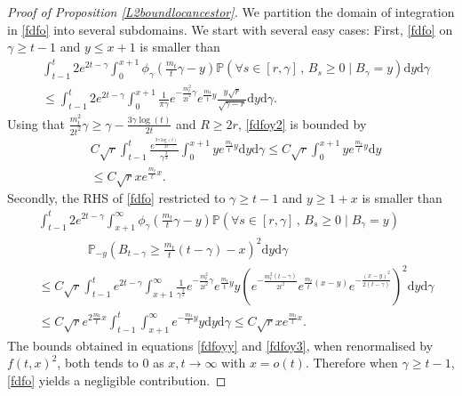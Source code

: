 \documentclass{article}
\newcommand{\Prob}{\mathbb{P}}
\begin{document}
\begin{proof}[Proof of Proposition \ref{L2boundlocancestor}]
We partition the domain of integration in \eqref{fdfo} into several subdomains.
We start with several easy cases: First, \eqref{fdfo} on $\gamma \geq t-1$ and $y \leq x+1$ is smaller than
\begin{equation}\label{fdfoy2}
    \begin{split}
        &\int_{t-1}^t 2e^{2t-\gamma}\int_{0}^{x+1}\phi_\gamma\left(\frac{m_t}{t}\gamma-y\right)\Prob\left(\forall s \in [r, \gamma] \, , \, B_s \geq 0 \mid B_\gamma = y \right)\mathrm{d}y\mathrm{d}\gamma
        \\& \leq \int_{t-1}^t 2e^{2t-\gamma}\int_{0}^{x+1}\frac{1}{\pi \gamma}e^{-\frac{m_t^2}{2t^2}\gamma}e^{\frac{m_t}{t}y}\frac{y \sqrt{r}}{\sqrt{\gamma - r}}\mathrm{d}y\mathrm{d}\gamma.
    \end{split}
\end{equation}
Using that $\frac{m_t^2}{2t^2}\gamma\geq  \gamma -\frac{3\gamma \log(t)}{2t}$ and $R\geq 2r$, \eqref{fdfoy2} is bounded by
\begin{equation}\label{fdfoyy}
    \begin{split}
        &C\sqrt{r}\int_{t-1}^t \frac{e^{\frac{3\gamma \log(t)}{2t}}}{\gamma^{\frac{3}{2}}}\int_{0}^{x+1}ye^{\frac{m_t}{t}y}\mathrm{d}y\mathrm{d}\gamma\leq C\sqrt{r}\int_{0}^{x+1}ye^{\frac{m_t}{t}y}\mathrm{d}y
        \\& \leq  C\sqrt{r}xe^{\frac{m_t}{t}x}.
    \end{split}
\end{equation}
Secondly, the RHS of \eqref{fdfo} restricted to $\gamma \geq t-1$ and $y\geq 1+x$ is smaller than
\begin{equation}\label{fdfoy3}
    \begin{split}
        &\int_{t-1}^t 2e^{2t-\gamma}\int_{x+1}^{\infty}\phi_\gamma\left(\frac{m_t}{t}\gamma-y\right)\Prob\left(\forall s \in [r, \gamma] \, , \, B_s \geq 0 \mid B_\gamma = y \right)\\
        & \qquad \qquad \Prob_{-y}\left( B_{t- \gamma} \geq \frac{m_t}{t}(t- \gamma)-x\right) ^2  \mathrm{d}y\mathrm{d}\gamma
        \\& \leq C \sqrt{r} \int_{t-1}^t e^{2t-\gamma}\int_{x+1}^{\infty}\frac{1}{ \gamma^{\frac{3}{2}}}e^{-\frac{m_t^2}{2t^2}\gamma}e^{\frac{m_t}{t}y}y\left(e^{-\frac{m_t^2(t-\gamma)}{2t^2}}e^{\frac{m_t}{t}(x-y)}e^{-\frac{(x-y)^2}{2(t-\gamma)}}\right)^2\mathrm{d}y\mathrm{d}\gamma
        \\& \leq C \sqrt{r}e^{2\frac{m_t}{t}x} \int_{t-1}^t \int_{x+1}^{\infty}e^{-\frac{m_t}{t}y}y\mathrm{d}y\mathrm{d}\gamma\leq C \sqrt{r}xe^{\frac{m_t}{t}x}.
    \end{split}
\end{equation}
The bounds obtained in equations \eqref{fdfoyy} and \eqref{fdfoy3}, when renormalised by $f(t,x)^2$, both tends to $0$ as $x,t\to \infty$ with  $x=o(t)$. Therefore when $\gamma \geq t-1$, \eqref{fdfo} yields a negligible contribution.


\end{proof}
\end{document}
